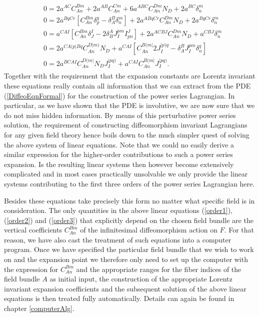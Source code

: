 \begin{align}\label{order3}
\begin{aligned}
&0 = 2 a^{AC}C_{An}^{Bm} + 2a^{AB}C_{An}^{Cm} + 6 a^{ABC}C_{An}^{Dm} N_D + 2a^{BC} \delta^m_n\\
&0 = 2 a^{BqCr} \left [ C_{An}^{Bm} \delta ^q_p - \delta^B_A \delta^m_n \right ] +2 a^{A Bq Cr} C_{An}^{Dm} N_D + 2 a^{BqCr} \delta^m_n\\
&0 = a^{CAI} \left [C_{An}^{Bm}\delta^I _J- 2 \delta^A_B J_I^{pm}I^J_{pn} \right ] + 2 a^{ACBJ} C_{An}^{Dm} N_D + a^{CBJ} \delta ^m _n \\
&0 = 2 a^{C A(p \vert B q} C_{An}^{D \vert m )} N_D + a^{CAI} \left [C_{An}^{B(m\vert} 2 J_{I}^{\vert p)q} - \delta_A^BJ_I^{pm}\delta^q_n \right ]\\
&0 = 2 a^{BCAI}C_{An}^{D(m\vert}N_DJ_I^{\vert pq)} + a^{CAI}C_{An}^{B(m \vert} J_I^{\vert pq)}.
\end{aligned}
\end{align}
Together with the requirement that the expansion constants are Lorentz invariant these equations really contain all information that we can extract from the PDE (\ref{DiffeoEqnFormal}) for the construction of the power series Lagrangian. In particular, as we have shown that the PDE is involutive, we are now sure that we do not miss hidden information.  By means of this perturbative power series solution, the requirement of constructing diffeomorphism invariant Lagrangians for any given field theory hence boils down to the much simpler quest of solving the above system of linear equations.
Note that we could no easily derive a similar expression for the higher-order contributions to such a power series expansion. Is the resulting linear systems then however become extensively complicated and in most cases practically unsolvable we only provide the linear systems contributing to the first three orders of the power series Lagrangian here. 

Besides these equations take precisely this form no matter what specific field is in consideration. The only quantities in the above linear equations (\ref{order1}), (\ref{order2}) and (\ref{order3}) that explicitly depend on the chosen field bundle are the vertical coefficients $C^{Bm}_{An}$ of the infinitesimal diffeomorphism action on $F$. For that reason, we have also cast the treatment of such equations into a computer program. Once we have specified the particular field bundle that we wish to work on and the expansion point we therefore only need to set up the computer with the expression for $C_{An}^{Bm}$ and the appropriate ranges for the fiber indices of the field bundle $A$ as initial input, the construction of the appropriate Lorentz invariant expansion coefficients and the subsequent solution of the above linear equations is then treated fully automatically. Details can again be found in chapter \ref{computerAlg}. 

